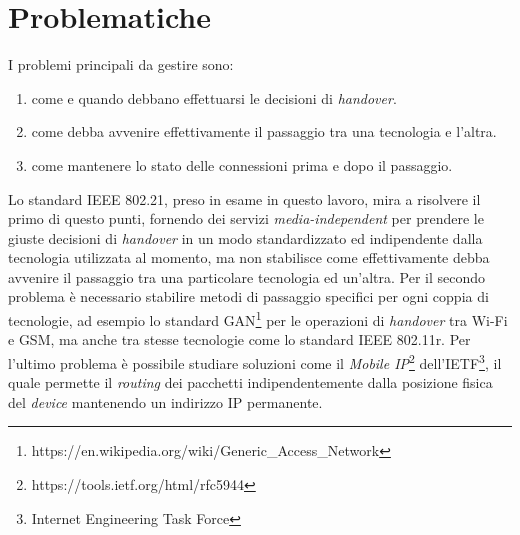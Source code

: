 \section{Problematiche}
I problemi principali da gestire sono:
\begin{enumerate}
\item come e quando debbano effettuarsi le decisioni di {\em handover}.
\item come debba avvenire effettivamente il passaggio tra una tecnologia e l'altra.
\item come mantenere lo stato delle connessioni prima e dopo il passaggio.
\end{enumerate}
Lo standard IEEE 802.21, preso in esame in questo lavoro, mira a risolvere il primo di questo punti, fornendo dei servizi {\em media-independent} per prendere le giuste decisioni di {\em handover} in un modo standardizzato ed indipendente dalla tecnologia utilizzata al momento, ma non stabilisce come effettivamente debba avvenire il passaggio tra una particolare tecnologia ed un'altra.
Per il secondo problema è necessario stabilire metodi di passaggio specifici per ogni coppia di tecnologie, ad esempio lo standard GAN\footnote{https://en.wikipedia.org/wiki/Generic\_Access\_Network} per le operazioni di {\em handover} tra Wi-Fi e GSM, ma anche tra stesse tecnologie come lo standard IEEE 802.11r.
Per l'ultimo problema è possibile studiare soluzioni come il {\em Mobile IP}\footnote{https://tools.ietf.org/html/rfc5944} dell'IETF\footnote{Internet Engineering Task Force}, il quale permette il {\em routing} dei pacchetti indipendentemente dalla posizione fisica del {\em device} mantenendo un indirizzo IP permanente.
